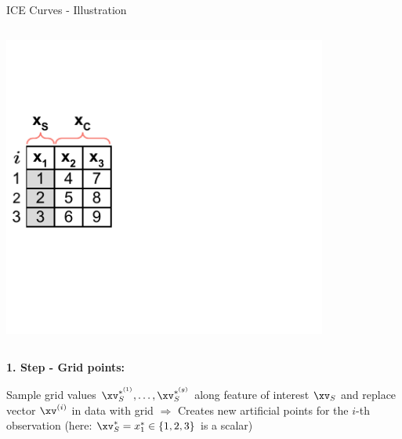 \documentclass[11pt,compress,t,notes=noshow, aspectratio=169, xcolor=table]{beamer}
\begin{document}
\begin{frame}{ICE Curves - Illustration}

\begin{columns}[T]
\begin{column}{0.4\textwidth}
\includegraphics[page=2, trim=0cm 0.35cm 0.85cm 0.35cm, width=0.9\textwidth]{figure_man/ice_plot_demo}
\end{column}
\begin{column}{0.55\textwidth}

\end{column}
\end{columns}
\vspace*{\topsep}

\textbf{1. Step - Grid points:}

Sample grid values $\xv_S^{*^{(1)}}, \dots, \xv_S^{*^{(g)}}$ along feature of interest $\xv_S$
%
and replace vector $\xv^{(i)}$ in data with grid
\newline $\Rightarrow$ Creates new artificial points for the $i$-th observation (here: $\xv_S^* = x_1^* \in \{1, 2, 3\}$ is a scalar)

\end{frame}
\end{document}
